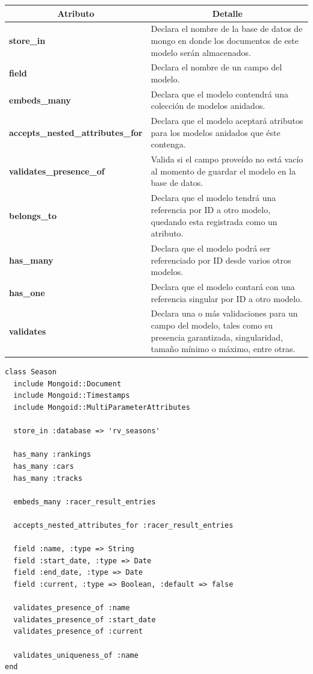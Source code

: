 \begin{center}
  \begin{tabular}{ | p{6cm} | p{9cm} |}
    \hline
    \multicolumn{1}{|c|}{\textbf{Atributo}} & \multicolumn{1}{|c|}{\textbf{Detalle}} \\
    \hline
    
    {\textbf{store\_in}} & Declara el nombre de la base de datos de mongo en donde los documentos de este modelo serán almacenados.\\ \hline
    {\textbf{field}} & Declara el nombre de un campo del modelo. \\ \hline
    {\textbf{embeds\_many}} & Declara que el modelo contendrá una colección de modelos anidados. \\ \hline
    {\textbf{accepts\_nested\_attributes\_for}} & Declara que el modelo aceptará atributos para los modelos anidados que éste contenga. \\ \hline
    {\textbf{validates\_presence\_of}} & Valida si el campo proveído no está vacío al momento de guardar el modelo en la base de datos. \\ \hline
    {\textbf{belongs\_to}} & Declara que el modelo tendrá una referencia por ID a otro modelo, quedando esta registrada como un atributo.
    \\ \hline
    {\textbf{has\_many}} & Declara que el modelo podrá ser referenciado por ID desde varios otros modelos. \\ \hline
    {\textbf{has\_one}} & Declara que el modelo contará con una referencia singular por ID a otro modelo. \\ \hline
    {\textbf{validates}} & Declara una o más validaciones para un campo del modelo, tales como su presencia garantizada, singularidad, tamaño mínimo o máximo, entre otras.\\ \hline
  \end{tabular}
  
  \label{table:schema}
\end{center}

\begin{listing}
  \begin{verbatim}
class Season
  include Mongoid::Document
  include Mongoid::Timestamps
  include Mongoid::MultiParameterAttributes
  
  store_in :database => 'rv_seasons'
  
  has_many :rankings
  has_many :cars
  has_many :tracks
  
  embeds_many :racer_result_entries
  
  accepts_nested_attributes_for :racer_result_entries
  
  field :name, :type => String
  field :start_date, :type => Date
  field :end_date, :type => Date
  field :current, :type => Boolean, :default => false
  
  validates_presence_of :name
  validates_presence_of :start_date
  validates_presence_of :current
  
  validates_uniqueness_of :name
end
  \end{verbatim}
\end{listing}

